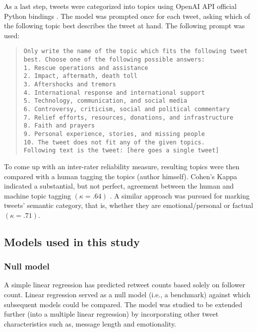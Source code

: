 \documentclass[11pt,a4paper]{article}
\begin{document}
    As a last step, tweets were categorized into topics using OpenAI API official Python bindings \cite{openai_llc_openai_2023}. The model was prompted once for each tweet, asking which of the following topic best describes the tweet at hand. The following prompt was used:
    \begin{quote}
        \texttt{Only write the name of the topic which fits the following tweet best. Choose one of the following possible answers: \\
        1. Rescue operations and assistance \\
        2. Impact, aftermath, death toll \\
        3. Aftershocks and tremors \\
        4. International response and international support \\
        5. Technology, communication, and social media \\
        6. Controversy, criticism, social and political commentary \\
        7. Relief efforts, resources, donations, and infrastructure \\
        8. Faith and prayers \\
        9. Personal experience, stories, and missing people \\
        10. The tweet does not fit any of the given topics. \\
        Following text is the tweet: [here goes a single tweet]} 
    \end{quote}

    
    To come up with an inter-rater reliability measure, resulting topics were then compared with a human tagging the topics (author himself). Cohen's Kappa  indicated a substantial, but not perfect, agreement between the human and machine topic tagging $(\kappa = .64)$ \cite{cohen_coefficient_1960}. A similar approach was pursued for marking tweets' semantic category, that is, whether they are emotional/personal or factual $(\kappa = .71)$.

    \subsection{Models used in this study}
        \subsubsection{Null model}
        A simple linear regression has predicted retweet counts based solely on follower count. Linear regression served as a null model (i.e., a benchmark) against which subsequent models could be compared. The model was studied to be extended further (into a multiple linear regression) by incorporating other tweet characteristics such as, message length and emotionality.
\end{document}
